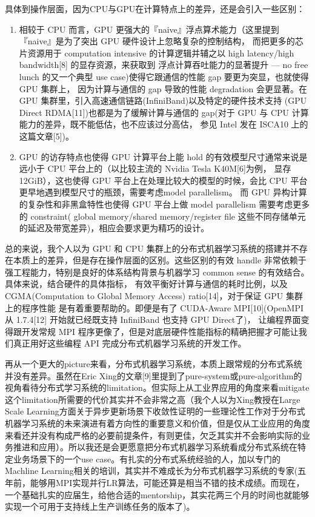 具体到操作层面，因为CPU与GPU在计算特点上的差异，还是会引入一些区别： 
\begin{enumerate}
  \item 相较于 CPU 而言，GPU 更强大的『naive』浮点算术能力（这里提到『naive』是为了突出 GPU 硬件设计上忽略复杂的控制结构，
  而把更多的芯片资源用于 computation intensive 的计算逻辑并辅之以 high latency/high bandwidth[8] 的显存资源，来获取到
  浮点计算吞吐能力的显著提升 --- no free lunch 的又一个典型 use case)使得它跟通信的性能 gap 要更为突显，也就使得 GPU 集群上，
  因为计算与通信的 gap 导致的性能 degradation 会更显著。在 GPU 集群里，引入高速通信链路(InfiniBand)以及特定的硬件技术支持
  (GPU Direct  RDMA[11])也都是为了缓解计算与通信的 gap(对于 GPU 与 CPU 计算能力的差异，既不能低估，也不应该过分高估，
  参见 Intel 发在 ISCA10 上的这篇文章[5])。
  \item GPU 的访存特点也使得 GPU 计算平台上能 hold 的有效模型尺寸通常来说是远小于 CPU 平台上的（以比较主流的 Nvidia Tesla K40M[6]为例，
  显存 12GiB），这也使得 GPU 平台上在处理比较大的模型的时候，会比 CPU 平台更早地遇到模型尺寸的瓶颈，需要考虑model parallelism。
  而 GPU 异构计算的复杂性和非黑盒特性也使得 GPU 平台上做 model parallelism 需要考虑更多的 constraint( global memory/shared memory/register file
  这些不同存储单元的延迟及带宽差异)，相应会要求更为精巧的设计。
\end{enumerate}

总的来说，我个人以为 GPU 和 CPU 集群上的分布式机器学习系统的搭建并不存在本质上的差异，但是存在操作层面的区别。这些区别的有效
handle 非常依赖于强工程能力，特别是良好的体系结构背景与机器学习 common sense 的有效结合。具体来说，结合硬件的具体指标，
有效平衡好计算与通信的耗时比例，以及 CGMA(Computation to Global Memory Access) ratio[14]，对于保证 GPU 集群上的程序性能
是有着重要帮助的。即便是有了 CUDA-Aware MPI[10](OpenMPI 从 1.7.4[12] 开始就已经既支持 InfiniBand 也支持 GPU Direct了)，
让编程界面变得跟开发常规 MPI 程序更像了，但是对底层硬件性能指标的精确把握才可能让我们真正用好这些编程 API 完成分布式机器学习系统的开发工作。

再从一个更大的picture来看，分布式机器学习系统，本质上跟常规的分布式系统并没有差异。虽然在Eric Xing的文章[9]里提到了pure-system或pure-algorithm的视角看待分布式学习系统的limitation。但实际上从工业界应用的角度来看mitigate这个limitation所需要的代价其实并不会非常之高（我个人以为Xing教授在Large Scale Learning方面关于异步更新场景下收敛性证明的一些理论性工作对于分布式机器学习系统的未来演进有着方向性的重要意义和价值，但是仅从工业应用的角度来看还并没有构成严格的必要前提条件，有则更佳，欠乏其实并不会影响实际的业务推进和应用）。所以我还是会更愿意把分布式机器学习系统看成分布式系统在特定业务场景下的一个use case。有扎实的分布式系统经验的人，加以专门的Machline Learning相关的培训，其实并不难成长为分布式机器学习系统的专家(五年前，能够用MPI实现并行LR算法，可能还算是相当不错的技术成绩。而现在，一个基础扎实的应届生，给他合适的mentorship，其实花两三个月的时间也就能够实现一个可用于支持线上生产训练任务的版本了)。

